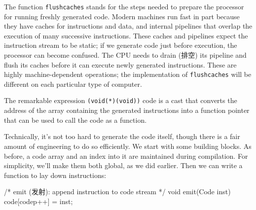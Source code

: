 The function \verb'flushcaches' stands for the steps needed to prepare the
processor for running freshly generated code. Modern machines run fast in
part because they have caches for instructions and data, and internal
pipelines that overlap the execution of many successive instructions. These
caches and pipelines expect the instruction stream to be static; if we
generate code just before execution, the processor can become confused. The
CPU needs to drain (排空) its pipeline and flush its caches before it can
execute newly generated instructions. These are highly machine-dependent
operations; the implementation of \verb'flushcaches' will be different on
each particular type of computer.

The remarkable expression \verb'(void(*)(void))' code is a cast that
converts the address of the array containing the generated instructions
into a function pointer that can be used to call the code as a function.

Technically, it's not too hard to generate the code itself, though there is
a fair amount of engineering to do so efficiently. We start with some
building blocks. As before, a code array and an index into it are
maintained during compilation. For simplicity, we'll make them both global,
as we did earlier. Then we can write a function to lay down instructions:
\begin{wellcode}
    /* emit (发射): append instruction to code stream */
    void emit(Code inst)
    {
        code[codep++] = inst;
    }
\end{wellcode}

